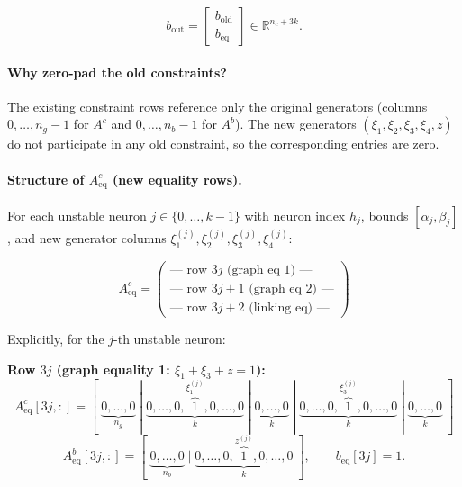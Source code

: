 \documentclass{article}
\begin{document}
\begin{equation}
\label{eq:case3_b_assembly}
b_{\mathrm{out}} =
\begin{bmatrix}
b_{\mathrm{old}} \\[4pt]
\hline
b_{\mathrm{eq}}
\end{bmatrix}
\in \mathbb{R}^{n_c + 3k}.
\end{equation}

\paragraph{Why zero-pad the old constraints?}
The existing constraint rows reference only the original generators (columns $0, \ldots, n_g{-}1$ for $A^c$ and $0, \ldots, n_b{-}1$ for $A^b$). The new generators $(\xi_1, \xi_2, \xi_3, \xi_4, z)$ do not participate in any old constraint, so the corresponding entries are zero.

\paragraph{Structure of $A^c_{\mathrm{eq}}$ (new equality rows).}

For each unstable neuron $j \in \{0, \ldots, k{-}1\}$ with neuron index $h_j$, bounds $[\alpha_j, \beta_j]$, and new generator columns $\xi_1^{(j)}, \xi_2^{(j)}, \xi_3^{(j)}, \xi_4^{(j)}$:

\begin{equation}
\label{eq:Ac_eq_detail}
A^c_{\mathrm{eq}} =
\begin{pmatrix}
\text{--- row } 3j \text{ (graph eq 1) ---} \\
\text{--- row } 3j{+}1 \text{ (graph eq 2) ---} \\
\text{--- row } 3j{+}2 \text{ (linking eq) ---}
\end{pmatrix}
\end{equation}

Explicitly, for the $j$-th unstable neuron:

\medskip
\noindent\textbf{Row $3j$ (graph equality 1: $\xi_1 + \xi_3 + z = 1$):}
\[
A^c_{\mathrm{eq}}[3j, :] = [\;\underbrace{0, \ldots, 0}_{n_g} \;|\; \underbrace{0, \ldots, 0, \overbrace{1}^{\xi_1^{(j)}}, 0, \ldots, 0}_{k} \;|\; \underbrace{0, \ldots, 0}_{k} \;|\; \underbrace{0, \ldots, 0, \overbrace{1}^{\xi_3^{(j)}}, 0, \ldots, 0}_{k} \;|\; \underbrace{0, \ldots, 0}_{k}\;]
\]
\[
A^b_{\mathrm{eq}}[3j, :] = [\;\underbrace{0, \ldots, 0}_{n_b} \;|\; \underbrace{0, \ldots, 0, \overbrace{1}^{z^{(j)}}, 0, \ldots, 0}_{k}\;], \qquad
b_{\mathrm{eq}}[3j] = 1.
\]
\end{document}
